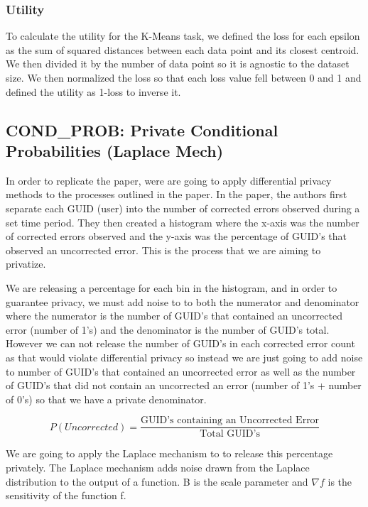 \documentclass[12pt,letterpaper]{article}
\begin{document}
\subsubsection{Utility}
To calculate the utility for the K-Means task, we defined the loss for each
epsilon as the sum of squared distances between each data point and its closest centroid. We then divided it by the number of data point so it is agnostic to the dataset size. We then normalized the loss so that each loss value fell between 0 and 1 and defined the utility as
1-loss to inverse it.



\subsection{COND\_PROB: Private Conditional Probabilities (Laplace Mech)}

In order to replicate the paper, were are going to apply differential privacy methods to the processes outlined in the paper. In the paper, the authors first separate each GUID (user) into the number of corrected errors observed during a set time period. They then created a histogram where the x-axis was the number of corrected errors observed and the y-axis was the percentage of GUID's that observed an uncorrected error.\cite{Kwasnick2023} This is the process that we are aiming to privatize. 

We are releasing a percentage for each bin in the histogram, and in order to guarantee privacy, we must add noise to to both the numerator and denominator where the numerator is the number of GUID's that contained an uncorrected error (number of 1's) and the denominator is the number of GUID's total. However we can not release the number of GUID's in each corrected error count as that would violate differential privacy so instead we are just going to add noise to number of GUID's that contained an uncorrected error as well as the number of GUID's that did not contain an uncorrected an error (number of 1's + number of 0's) so that we have a private denominator. 

\[
P(Uncorrected) = \frac{\text{GUID's containing an Uncorrected Error}}{\text{Total GUID's}}
\]

We are going to apply the Laplace mechanism to to release this percentage privately. The Laplace mechanism adds noise drawn from the Laplace distribution to the output of a function. B is the scale parameter and $\nabla f$ is the sensitivity of the function f. \cite{DworkRoth}
\end{document}
